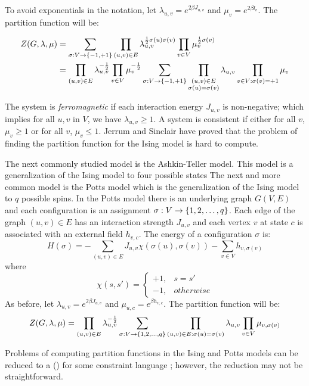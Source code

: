 To avoid exponentials in the notation, let \(\lambda_{u,v}=e^{2\beta J_{u,v}}\) and 
\(\mu_{v}=e^{2\beta l_v}\). The partition function will be:

\begin{align*}
Z(G,\lambda,\mu)&=\sum_{\sigma :V\to\{{-1,+1}\}} \prod_{(u,v)\in E} \lambda_{u,v}^{\frac{1}{2}
\sigma(u)\sigma(v)}\prod_{v\in V}\mu_v^{\frac{1}{2}\sigma(v)}\\
&=\prod_{(u,v)\in E}\lambda_{u,v}^{-\frac{1}{2}}\prod_{v\in V}\mu_v^{-\frac{1}{2}}\sum_{\sigma:V\to
\{{-1,+1}\}}
\prod_{\substack{(u,v)\in E \\ \sigma(u)=\sigma(v)}}\lambda_{u,v}\prod_{v\in V:
\sigma(v)=+1}\mu_v
\end{align*}

The system is \emph{ferromagnetic} if each interaction energy \(J_{u,v}\) is non-negative; 
which implies for all \(u,v\) in \(V\), we have \(\lambda_{u,v} \ge 1\)\@.
A system is consistent if
either for all \(v\), \(\mu_v\ge 1\) or for all \(v\), \(\mu_v \le 1\)\@.
Jerrum and Sinclair \cite{Jer93} have proved that the problem of finding the partition
function for the Ising model is hard to compute.

The next commonly studied model is the Ashkin-Teller model.
This model is a generalization of the Ising model to four possible states
The next and more common model is the Potts model which
is the  generalization of the Ising model to \(q\) possible spins.
In the Potts model there is an underlying graph \(G(V,E)\) and 
each configuration is an assignment \(\sigma:V\to \{{{1,2,\dotsc,q}}\}\)\@.
Each edge of the graph \((u,v)\in E\) has an interaction
strength \(J_{u,v}\) and each vertex \(v\) at state \(c\) is associated with an
external field \(h_{v,c}\)\@. The energy of a configuration $\sigma$ is:
\[H(\sigma)=-\sum_{(u,v)\in E} J_{u,v}\chi(\sigma(u),\sigma(v)) - \sum_{v\in V} 
h_{v,\sigma(v)}\]
where
\[\chi(s,s')=\begin{cases}+1, & s=s'\\-1, & otherwise\end{cases}\]
As before, let \(\lambda_{u,v}=e^{2\beta J_{u,v}}\) and
\(\mu_{u,c}=e^{\beta h_{v,c}}\)\@. The partition function will be:
\[Z(G,\lambda,\mu)=\prod_{(u,v)\in E}\lambda_{u,v}^{-\frac{1}{2}}
\sum_{\sigma:V\to\{{{1,2,\dotsc,q}}\}} \prod_{(u,v)\in E:\sigma(u)=\sigma(v)}\lambda_{u,v}
\prod_{v\in V}\mu_{v,\sigma(v)}\]

Problems of computing partition functions in the Ising and Potts models can be
reduced to a \ccsp(\mrelset) for some constraint language \mrelset; however, the reduction
may not be straightforward.

